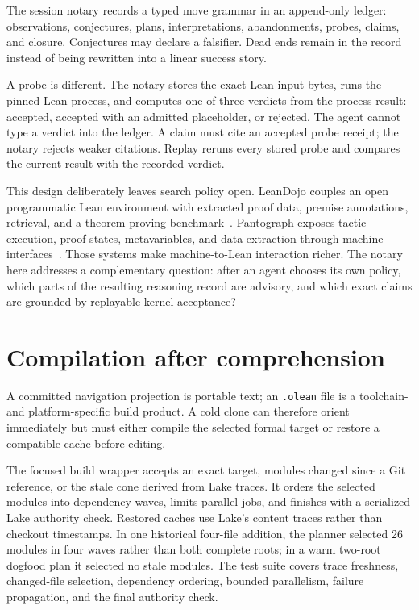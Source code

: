 \documentclass[11pt]{article}
\begin{document}
The session notary records a typed move grammar in an append-only ledger:
observations, conjectures, plans, interpretations, abandonments, probes,
claims, and closure. Conjectures may declare a falsifier. Dead ends remain in
the record instead of being rewritten into a linear success story.

A probe is different. The notary stores the exact Lean input bytes, runs the
pinned Lean process, and computes one of three verdicts from the process
result: accepted, accepted with an admitted placeholder, or rejected. The
agent cannot type a verdict into the ledger. A claim must cite an accepted
probe receipt; the notary rejects weaker citations. Replay reruns every stored
probe and compares the current result with the recorded verdict.

This design deliberately leaves search policy open. LeanDojo couples an open
programmatic Lean environment with extracted proof data, premise annotations,
retrieval, and a theorem-proving benchmark~\cite{leandojo}. Pantograph exposes
tactic execution, proof states, metavariables, and data extraction through
machine interfaces~\cite{pantograph}. Those systems make machine-to-Lean
interaction richer. The notary here addresses a complementary question: after
an agent chooses its own policy, which parts of the resulting reasoning record
are advisory, and which exact claims are grounded by replayable kernel
acceptance?

\section{Compilation after comprehension}\label{sec:incremental}

A committed navigation projection is portable text; an \texttt{.olean} file is
a toolchain- and platform-specific build product. A cold clone can therefore
orient immediately but must either compile the selected formal target or
restore a compatible cache before editing.

The focused build wrapper accepts an exact target, modules changed since a Git
reference, or the stale cone derived from Lake traces. It orders the selected
modules into dependency waves, limits parallel jobs, and finishes with a
serialized Lake authority check. Restored caches use Lake's content traces
rather than checkout timestamps. In one historical four-file addition, the
planner selected 26 modules in four waves rather than both complete roots; in a
warm two-root dogfood plan it selected no stale modules. The test suite covers
trace freshness, changed-file selection, dependency ordering, bounded
parallelism, failure propagation, and the final authority check.
\end{document}
